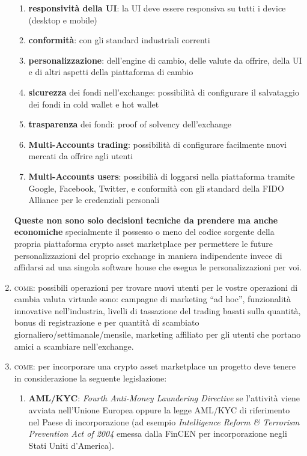 \documentclass[11pt,fleqn,oneside]{book} %
\begin{document}
\begin{enumerate}
\begin{enumerate}[label*=\arabic*.]
			\item \textbf{responsività della UI}: la UI deve essere responsiva su tutti i device (desktop e mobile)
			\item \textbf{conformità}: con gli standard industriali correnti
			\item \textbf{personalizzazione}: dell'engine di cambio, delle valute da offrire, della UI e di altri aspetti della piattaforma di cambio
			\item \textbf{sicurezza} dei fondi nell'exchange: possibilità di configurare il salvataggio dei fondi in cold wallet e hot wallet
			\item \textbf{trasparenza} dei fondi: proof of solvency dell'exchange
			\item \textbf{Multi-Accounts trading}: possibilità di configurare facilmente nuovi mercati da offrire agli utenti
			\item \textbf{Multi-Accounts users}: possibilià di loggarsi nella piattaforma tramite Google, Facebook, Twitter, e conformità
			con gli standard della FIDO Alliance per le credenziali personali
		\end{enumerate}	
	\textbf{Queste non sono solo decisioni tecniche da prendere ma anche economiche} specialmente il possesso o meno del codice sorgente della propria 
	piattaforma	crypto asset marketplace per permettere le future personalizzazioni del proprio exchange in maniera indipendente invece di affidarsi
	ad una singola software house che esegua le personalizzazioni per voi.
	\item \textsc{come}: possibili operazioni per trovare nuovi utenti per le vostre operazioni di cambia valuta virtuale sono:
	campagne di marketing ``ad hoc'', funzionalità innovative nell'industria, livelli di tassazione del trading basati sulla quantità, 
	bonus di registrazione e per quantità di scambiato giornaliero/settimanale/mensile, marketing affiliato per gli utenti che portano
	amici a scambiare nell'exchange.
	\item \textsc{come}: per incorporare una crypto asset marketplace un progetto deve tenere in considerazione la seguente legislazione:
		\begin{enumerate}[label*=\arabic*.]
			\item \textbf{AML/KYC}: \textit{Fourth Anti-Money Laundering Directive} se l'attività viene avviata nell'Unione Europea \cite{4AMLD} 
			oppure la legge AML/KYC di riferimento nel Paese di incorporazione (ad esempio \textit{Intelligence Reform \& Terrorism Prevention Act of 2004}
			emessa dalla FinCEN per incorporazione negli Stati Uniti d'America).\\

\end{enumerate}
\end{enumerate}
\end{document}
